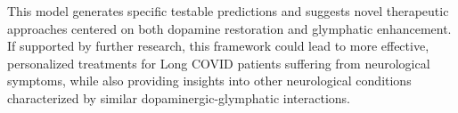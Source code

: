 \documentclass[12pt]{article}
\begin{document}
This model generates specific testable predictions and suggests novel therapeutic approaches centered on both dopamine restoration and glymphatic enhancement. If supported by further research, this framework could lead to more effective, personalized treatments for Long COVID patients suffering from neurological symptoms, while also providing insights into other neurological conditions characterized by similar dopaminergic-glymphatic interactions.



\end{document}
